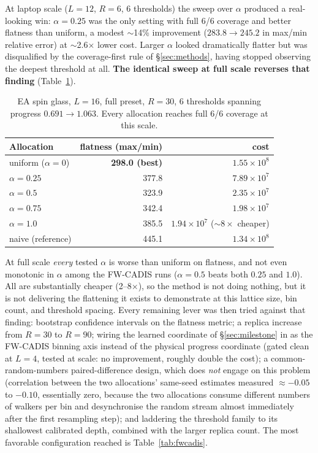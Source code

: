 \documentclass[a4paper,fleqn]{cas-sc}
\begin{document}
	At laptop scale ($L=12$, $R=6$, 6 thresholds) the sweep over $\alpha$ produced a
	real-looking win: $\alpha=0.25$ was the only setting with full 6/6 coverage and better
	flatness than uniform, a modest $\sim$14\% improvement ($283.8\to245.2$ in max/min relative
	error) at $\sim$2.6$\times$ lower cost. Larger $\alpha$ looked dramatically flatter but was
	disqualified by the coverage-first rule of \S\ref{sec:methods}, having stopped observing the
	deepest threshold at all. \textbf{The identical sweep at full scale reverses that finding}
	(Table~\ref{tab:fwfull}).
	
	\begin{table}[H]
		\centering\small
		\caption{EA spin glass, $L=16$, full preset, $R=30$, 6 thresholds spanning progress
			$0.691\to1.063$. Every allocation reaches full 6/6 coverage at this scale.}
		\label{tab:fwfull}
		\begin{tabular}{lrr}
			\toprule
			Allocation & flatness (max/min) & cost \\
			\midrule
			uniform ($\alpha=0$) & \textbf{298.0 (best)} & $1.55\times10^{8}$ \\
			$\alpha=0.25$ & 377.8 & $7.89\times10^{7}$ \\
			$\alpha=0.5$ & 323.9 & $2.35\times10^{7}$ \\
			$\alpha=0.75$ & 342.4 & $1.98\times10^{7}$ \\
			$\alpha=1.0$ & 385.5 & $1.94\times10^{7}$ ($\sim\!8\times$ cheaper) \\
			naive (reference) & 445.1 & $1.34\times10^{8}$ \\
			\bottomrule
		\end{tabular}
	\end{table}
	
	At full scale \emph{every} tested $\alpha$ is worse than uniform on flatness, and not even
	monotonic in $\alpha$ among the FW-CADIS runs ($\alpha=0.5$ beats both $0.25$ and $1.0$).
	All are substantially cheaper (2--8$\times$), so the method is not doing nothing, but it is
	not delivering the flattening it exists to demonstrate at this lattice size, bin count, and
	threshold spacing. Every remaining lever was then tried against that finding: bootstrap
	confidence intervals on the flatness metric; a replica increase from $R=30$ to $R=90$;
	wiring the learned coordinate of \S\ref{sec:milestone} in as the FW-CADIS binning axis
	instead of the physical progress coordinate (gated clean at $L=4$, tested at scale: no
	improvement, roughly double the cost); a common-random-numbers paired-difference design,
	which does \emph{not} engage on this problem (correlation between the two allocations'
	same-seed estimates measured $\approx-0.05$ to $-0.10$, essentially zero, because the two
	allocations consume different numbers of walkers per bin and desynchronise the random stream
	almost immediately after the first resampling step); and laddering the threshold family to
	its shallowest calibrated depth, combined with the larger replica count. The most favorable
	configuration reached is Table~\ref{tab:fwcadis}.
	
\end{document}
